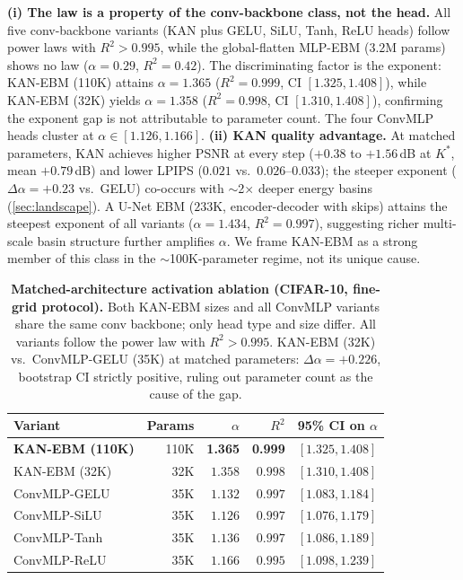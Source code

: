 \documentclass{article}
\begin{document}
\textbf{(i) The law is a property of the conv-backbone class, not the head.} All five conv-backbone variants (KAN plus GELU, SiLU, Tanh, ReLU heads) follow power laws with $R^2{>}0.995$, while the global-flatten MLP-EBM ($3.2$M params) shows no law ($\alpha{=}0.29$, $R^2{=}0.42$). The discriminating factor is the exponent: KAN-EBM (110K) attains $\alpha{=}1.365$ ($R^2{=}0.999$, CI $[1.325, 1.408]$), while KAN-EBM (32K) yields $\alpha{=}1.358$ ($R^2{=}0.998$, CI $[1.310, 1.408]$), confirming the exponent gap is not attributable to parameter count. The four ConvMLP heads cluster at $\alpha \in [1.126, 1.166]$. \textbf{(ii) KAN quality advantage.} At matched parameters, KAN achieves higher PSNR at every step ($+0.38$ to $+1.56$\,dB at $K^*$, mean $+0.79$\,dB) and lower LPIPS ($0.021$ vs.~$0.026$--$0.033$); the steeper exponent ($\Delta\alpha{=}+0.23$ vs.~GELU) co-occurs with $\sim$2$\times$ deeper energy basins (\cref{sec:landscape}). A U-Net EBM ($233$K, encoder-decoder with skips) attains the steepest exponent of all variants ($\alpha{=}1.434$, $R^2{=}0.997$), suggesting richer multi-scale basin structure further amplifies $\alpha$. We frame KAN-EBM as a strong member of this class in the $\sim$100K-parameter regime, not its unique cause.

\begin{table}[h]
\centering\small
\begin{tabular}{lrrrl}
\toprule
Variant & Params & $\alpha$ & $R^2$ & 95\% CI on $\alpha$ \\
\midrule
\textbf{KAN-EBM (110K)} & 110K & \textbf{1.365} & \textbf{0.999} & $[1.325, 1.408]$ \\
KAN-EBM (32K)  & 32K  & $1.358$ & $0.998$ & $[1.310, 1.408]$ \\
\midrule
ConvMLP-GELU    & 35K & $1.132$ & $0.997$ & $[1.083, 1.184]$ \\
ConvMLP-SiLU    & 35K & $1.126$ & $0.997$ & $[1.076, 1.179]$ \\
ConvMLP-Tanh    & 35K & $1.136$ & $0.997$ & $[1.086, 1.189]$ \\
ConvMLP-ReLU    & 35K & $1.166$ & $0.995$ & $[1.098, 1.239]$ \\
\bottomrule
\end{tabular}
\caption{\textbf{Matched-architecture activation ablation (CIFAR-10, fine-grid protocol).} Both KAN-EBM sizes and all ConvMLP variants share the same conv backbone; only head type and size differ. All variants follow the power law with $R^2{>}0.995$. KAN-EBM (32K) vs.~ConvMLP-GELU (35K) at matched parameters: $\Delta\alpha{=}+0.226$, bootstrap CI strictly positive, ruling out parameter count as the cause of the gap.}
\label{tab:smooth-mlp}
\end{table}
\end{document}
